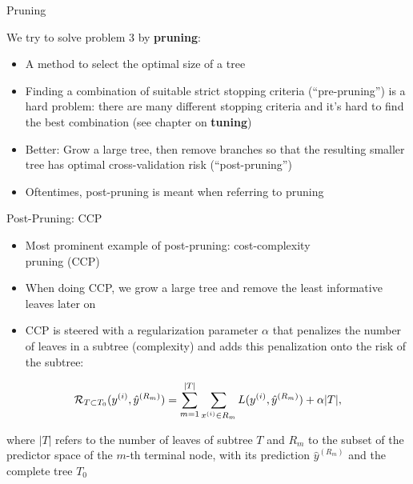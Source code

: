 \documentclass[11pt,compress,t,notes=noshow, xcolor=table]{beamer}
\begin{document}
\begin{vbframe}{Pruning}

We try to solve problem 3 by \textbf{pruning}:

\begin{itemize}
\item A method to select the optimal size of a tree
\item Finding a combination of suitable strict stopping criteria (\enquote{pre-pruning}) is a hard problem: there are many different stopping criteria and it's hard to find the best combination (see chapter on \textbf{tuning})
\item Better: Grow a large tree, then remove branches so that the resulting smaller tree has optimal cross-validation risk (\enquote{post-pruning})
\item Oftentimes, post-pruning is meant when referring to pruning

\end{itemize}
\end{vbframe}

\begin{vbframe}{Post-Pruning: CCP}
\begin{itemize}
\item Most prominent example of post-pruning: cost-complexity \\ pruning (CCP)
\item When doing CCP, we grow a large tree and remove the least informative leaves later on
\item CCP is steered with a regularization parameter $\alpha$ that penalizes the number of leaves in a subtree (complexity) and adds this penalization onto the risk of the subtree:
\end{itemize}

$$\mathcal{R}_{T \subset T_0}(y^{(i)}, \hat{y}^{(R_m)}) = \sum_{m=1}^{|T|} \sum_{x^{(i)} \in R_m} L(y^{(i)}, \hat{y}^{(R_m)}) + \alpha |T|,$$

where $|T|$ refers to the number of leaves of subtree $T$ and $R_m$ to the subset of the predictor space of the $m$-th terminal node, with its prediction $\hat{y}^{(R_m)}$ and the complete tree $T_0$

\end{vbframe}
\end{document}
